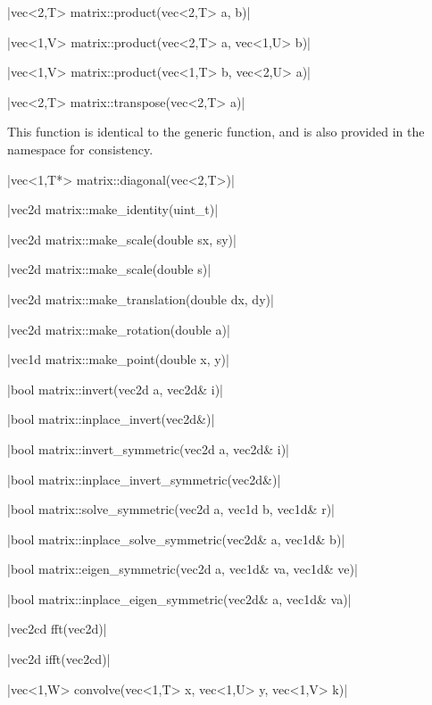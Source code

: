 \funcitem \cppinline|vec<2,T> matrix::product(vec<2,T> a, b)| 

\cppinline|vec<1,V> matrix::product(vec<2,T> a, vec<1,U> b)|

\cppinline|vec<1,V> matrix::product(vec<1,T> b, vec<2,U> a)|

\funcitem \cppinline|vec<2,T> matrix::transpose(vec<2,T> a)| 

This function is identical to the generic  function, and is also provided in the  namespace for consistency.

\funcitem \cppinline|vec<1,T*> matrix::diagonal(vec<2,T>)| 

\funcitem \cppinline|vec2d matrix::make_identity(uint_t)| 

\funcitem \cppinline|vec2d matrix::make_scale(double sx, sy)| 

\cppinline|vec2d matrix::make_scale(double s)|

\funcitem \cppinline|vec2d matrix::make_translation(double dx, dy)| 

\funcitem \cppinline|vec2d matrix::make_rotation(double a)| 

\funcitem \cppinline|vec1d matrix::make_point(double x, y)| 

\funcitem {} \cppinline|bool matrix::invert(vec2d a, vec2d& i)| 

 \cppinline|bool matrix::inplace_invert(vec2d&)| 

 \cppinline|bool matrix::invert_symmetric(vec2d a, vec2d& i)| 

 \cppinline|bool matrix::inplace_invert_symmetric(vec2d&)| 

\funcitem {} \cppinline|bool matrix::solve_symmetric(vec2d a, vec1d b, vec1d& r)| 

 \cppinline|bool matrix::inplace_solve_symmetric(vec2d& a, vec1d& b)| 

\funcitem {} \cppinline|bool matrix::eigen_symmetric(vec2d a, vec1d& va, vec1d& ve)| 

 \cppinline|bool matrix::inplace_eigen_symmetric(vec2d& a, vec1d& va)| 

\funcitem {} \cppinline|vec2cd fft(vec2d)| 

 \cppinline|vec2d ifft(vec2cd)| 

\funcitem \cppinline|vec<1,W> convolve(vec<1,T> x, vec<1,U> y, vec<1,V> k)| 
